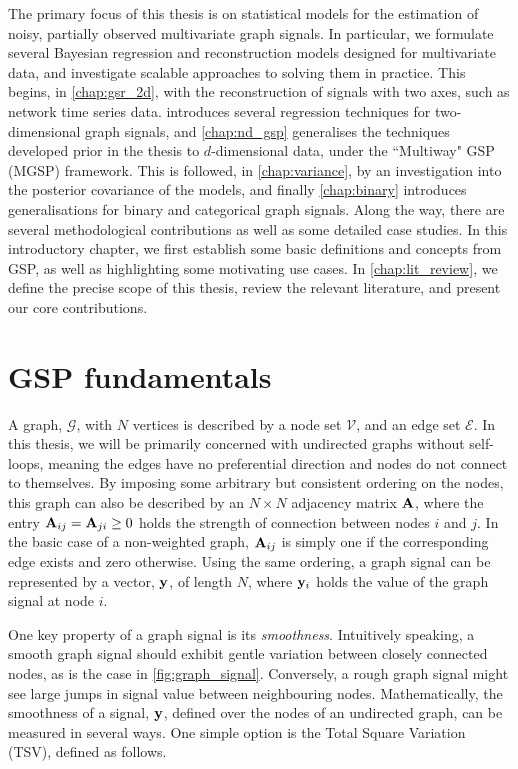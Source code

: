 The primary focus of this thesis is on statistical models for the estimation of noisy, partially observed multivariate graph signals. In particular, we formulate several Bayesian regression and reconstruction models designed for multivariate data, and investigate scalable approaches to solving them in practice. This begins, in \cref{chap:gsr_2d}, with the reconstruction of signals with two axes, such as network time series data.  introduces several regression techniques for two-dimensional graph signals, and \cref{chap:nd_gsp} generalises the techniques developed prior in the thesis to $d$-dimensional data, under the ``Multiway" GSP (MGSP) framework. This is followed, in \cref{chap:variance}, by an investigation into the posterior covariance of the models, and finally \cref{chap:binary} introduces generalisations for binary and categorical graph signals. Along the way, there are several methodological contributions as well as some detailed case studies. In this introductory chapter, we first establish some basic definitions and concepts from GSP, as well as highlighting some motivating use cases. In \cref{chap:lit_review}, we define the precise scope of this thesis, review the relevant literature, and present our core contributions. 


\section{GSP fundamentals}

A graph, $\mathcal{G}$, with $N$ vertices is described by a node set $\mathcal{V}$, and an edge set $\mathcal{E}$. In this thesis, we will be primarily concerned with undirected graphs without self-loops, meaning the edges have no preferential direction and nodes do not connect to themselves. By imposing some arbitrary but consistent ordering on the nodes, this graph can also be described by an $N \times N$ adjacency matrix $\mathbf{A}$, where the entry $\mathbf{A}_{ij} = \mathbf{A}_{ji} \geq 0$ holds the strength of connection between nodes $i$ and $j$. In the basic case of a non-weighted graph, $\mathbf{A}_{ij}$ is simply one if the corresponding edge exists and zero otherwise. Using the same ordering, a graph signal can be represented by a vector, $\mathbf{y}$, of length $N$, where $\mathbf{y}_i$ holds the value of the graph signal at node $i$. 

One key property of a graph signal is its \textit{smoothness}. Intuitively speaking, a smooth graph signal should exhibit gentle variation between closely connected nodes, as is the case in \cref{fig:graph_signal}. Conversely, a rough graph signal might see large jumps in signal value between neighbouring nodes. Mathematically, the smoothness of a signal, $\mathbf{y}$, defined over the nodes of an undirected graph, can be measured in several ways. One simple option is the Total Square Variation (TSV), defined as follows. 

